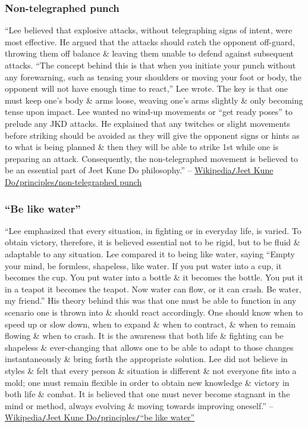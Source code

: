 \documentclass[oneside]{book}
\numberwithin{equation}{section}
\begin{document}
\subsubsection{Non-telegraphed punch}
``Lee believed that explosive attacks, without telegraphing signs of intent, were most effective. He argued that the attacks should catch the opponent off-guard, throwing them off balance \& leaving them unable to defend against subsequent attacks. ``The concept behind this is that when you initiate your punch without any forewarning, such as tensing your shoulders or moving your foot or body, the opponent will not have enough time to react,'' Lee wrote. The key is that one must keep one's body \& arms loose, weaving one's arms slightly \& only becoming tense upon impact. Lee wanted no wind-up movements or ``get ready poses'' to prelude any JKD attacks. He explained that any twitches or slight movements before striking should be avoided as they will give the opponent signs or hints as to what is being planned \& then they will be able to strike 1st while one is preparing an attack. Consequently, the non-telegraphed movement is believed to be an essential part of Jeet Kune Do philosophy.'' -- \href{https://en.wikipedia.org/wiki/Jeet_Kune_Do#Non-telegraphed_punch}{Wikipedia\texttt{/}Jeet Kune Do\texttt{/}principles\texttt{/}non-telegraphed punch}

\subsubsection{``Be like water''}
``Lee emphasized that every situation, in fighting or in everyday life, is varied. To obtain victory, therefore, it is believed essential not to be rigid, but to be fluid \& adaptable to any situation. Lee compared it to being like water, saying ``Empty your mind, be formless, shapeless, like water. If you put water into a cup, it becomes the cup. You put water into a bottle \& it becomes the bottle. You put it in a teapot it becomes the teapot. Now water can flow, or it can crash. Be water, my friend.'' His theory behind this was that one must be able to function in any scenario one is thrown into \& should react accordingly. One should know when to speed up or slow down, when to expand \& when to contract, \& when to remain flowing \& when to crash. It is the awareness that both life \& fighting can be shapeless \& ever-changing that allows one to be able to adapt to those changes instantaneously \& bring forth the appropriate solution. Lee did not believe in styles \& felt that every person \& situation is different \& not everyone fits into a mold; one must remain flexible in order to obtain new knowledge \& victory in both life \& combat. It is believed that one must never become stagnant in the mind or method, always evolving \& moving towards improving oneself.'' -- \href{https://en.wikipedia.org/wiki/Jeet_Kune_Do#%22Be_like_water%22}{Wikipedia\texttt{/}Jeet Kune Do\texttt{/}principles\texttt{/}``be like water''}
\end{document}
